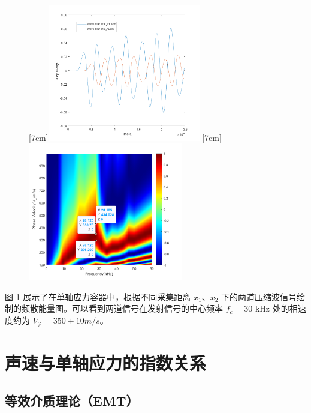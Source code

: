 \begin{figure}[!hbtp]
  \centering
                [7cm]{\includegraphics[height=6cm]{figures/2_wave_train.png}}
  \hspace{1cm}
                [7cm]{\includegraphics[height=6cm]{figures/2_cwt_v_phi.png}}
  \label{fig:dispersion_energy}
\end{figure}

图 \ref{fig:dispersion_energy} 展示了在单轴应力容器中，根据不同采集距离 $x_{1}$、$x_{2}$ 下的两道压缩波信号绘制的频散能量图。可以看到两道信号在发射信号的中心频率 $f_{c} = 30\text{ kHz}$ 处的相速度约为 $V_{\varphi} = 350\pm 10\unit{m/s}$。

\section{声速与单轴应力的指数关系}

\subsection{等效介质理论（EMT）}

